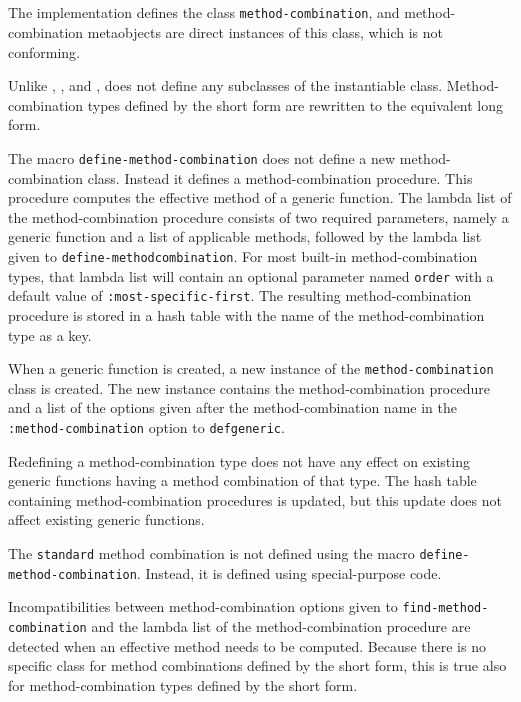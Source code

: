 \subsection{\ecl{}}
\label{sec-ecl}

The \ecl{} \commonlisp{} implementation defines the class
\texttt{method-combination}, and method-combination metaobjects are
direct instances of this class, which is not conforming.

Unlike \pcl{}, \sbcl{}, and \ccl{}, \ecl{} does not define any
subclasses of the instantiable class.  Method-combination types
defined by the short form are rewritten to the equivalent long form.

The macro \texttt{define-method-combination} does not define a new
method-combination class.  Instead it defines a method-combination
procedure.  This procedure computes the effective method of a generic
function.  The lambda list of the method-combination procedure
consists of two required parameters, namely a generic function and a
list of applicable methods, followed by the lambda list given to
\texttt{define-method\-combination}.  For most built-in
method-combination types, that lambda list will contain an optional
parameter named \texttt{order} with a default value of
\texttt{:most-specific-first}.  The resulting method-combination
procedure is stored in a hash table with the name of the
method-combination type as a key.

When a generic function is created, a new instance of the
\texttt{method-combination} class is created.  The new instance
contains the method-combination procedure and a list of the options
given after the method-combination name in the
\texttt{:method-combination} option to \texttt{defgeneric}.

Redefining a method-combination type does not have any effect on
existing generic functions having a method combination of that type.
The hash table containing method-combination procedures is updated,
but this update does not affect existing generic functions.

The \texttt{standard} method combination is not defined using the
macro \texttt{define-method-combination}.  Instead, it is defined
using special-purpose code.

Incompatibilities between method-combination options given to
\texttt{find-method-combination} and the lambda list of the
method-combination procedure are detected when an effective method
needs to be computed.  Because there is no specific class for method
combinations defined by the short form, this is true also for
method-combination types defined by the short form.

